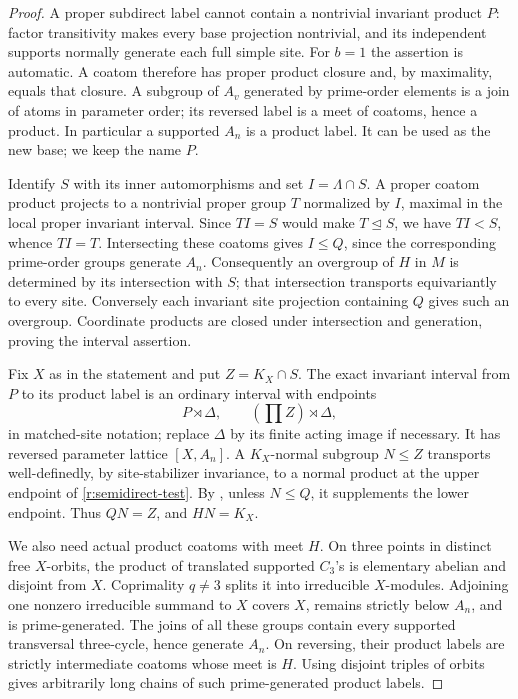 \begin{proof}
A proper subdirect label cannot contain a nontrivial invariant product
$P$: factor transitivity makes every base projection nontrivial, and
its independent supports normally generate each full simple site.
For $b=1$ the assertion is automatic.  A coatom therefore has proper
product closure and, by maximality, equals that closure.  A subgroup
of $A_v$ generated by prime-order elements is a join of atoms in
parameter order; its reversed label is a meet of coatoms, hence a
product.  In particular a supported $A_n$ is a product label.  It
can be used as the new base; we keep the name $P$.

Identify $S$ with its inner automorphisms and set $I=\Lambda\cap S$.
A proper coatom product projects to a nontrivial proper group $T$
normalized by $I$, maximal in the local proper invariant interval.
Since $TI=S$ would make $T\trianglelefteq S$, we have $TI<S$, whence
$TI=T$.  Intersecting these coatoms gives $I\le Q$, since the
corresponding prime-order groups generate $A_n$.  Consequently an
overgroup of $H$ in $M$ is determined by its intersection with $S$;
that intersection transports equivariantly to every site.  Conversely
each invariant site projection containing $Q$ gives such an overgroup.
Coordinate products are closed under intersection and generation,
proving the interval assertion.

Fix $X$ as in the statement and put $Z=K_X\cap S$.
The exact invariant interval from $P$ to its product label is an
ordinary interval with endpoints
\begin{equation}\label{r:semidirect-test}
 P\rtimes\Delta,\qquad (\textstyle\prod Z)\rtimes\Delta,
\end{equation}
in matched-site notation; replace $\Delta$ by its finite acting image
if necessary.  It has reversed parameter lattice $[X,A_n]$.
A $K_X$-normal subgroup $N\le Z$ transports well-definedly, by
site-stabilizer invariance, to a normal product at the upper endpoint
of \eqref{r:semidirect-test}.  By , unless
$N\le Q$, it supplements the lower endpoint.  Thus $QN=Z$, and
$HN=K_X$.

We also need actual product coatoms with meet $H$.  On three points
in distinct free $X$-orbits, the product of translated supported
$C_3$'s is elementary abelian and disjoint from $X$.  Coprimality
$q\ne3$ splits it into irreducible $X$-modules.  Adjoining one
nonzero irreducible summand to $X$ covers $X$, remains strictly
below $A_n$, and is prime-generated.  The joins of all these groups
contain every supported transversal three-cycle, hence generate
$A_n$.  On reversing, their product labels are strictly intermediate
coatoms whose meet is $H$.  Using disjoint triples of orbits gives
arbitrarily long chains of such prime-generated product labels.


\end{proof}
